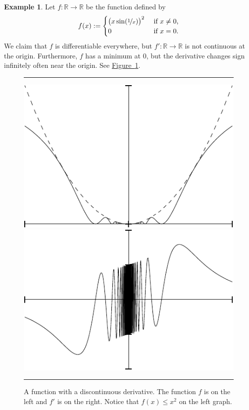 \documentclass[12pt]{book}
\newenvironment{myfigureht}{%
\begin{figure}[h!t]
\noindent\rule{\textwidth}{0.4pt}\vspace{12pt}\par\centering}%
{\par\noindent\rule{\textwidth}{0.4pt}
\end{figure}}
\newcommand{\R}{{\mathbb{R}}}
\theoremstyle{plain}
\theoremstyle{remark}
\theoremstyle{definition}
\theoremstyle{exercise}
\theoremstyle{example}
\newtheorem{example}[thm]{Example}
\newcommand{\figureref}[1]{\hyperref[#1]{Figure~\ref*{#1}}}
\begin{document}
\begin{example} \label{baddifffunc:example}
Let $f \colon \R \to \R$ be the function defined by
\begin{equation*}
f(x) :=
\begin{cases}
{\bigl( x \sin(\nicefrac{1}{x}) \bigr)}^2 & \text{ if $x \not= 0$,} \\
0 & \text{ if $x = 0$.}
\end{cases}
\end{equation*}
We claim that $f$ is differentiable everywhere, but
$f' \colon \R \to \R$ is not continuous at
the origin.  Furthermore, $f$ has a minimum at 0, but the derivative
changes sign infinitely often near the origin.
See \figureref{fig:nonc1diff}.
\begin{myfigureht}
\includegraphics{figures/nonc1difffig}
\qquad
\includegraphics{figures/nonc1diffderfig}
\caption{A function with a discontinuous derivative. The function $f$ is on the left
and $f'$ is on the right.  Notice that $f(x) \leq x^2$ on the left graph.\label{fig:nonc1diff}}
\end{myfigureht}


\end{example}
\end{document}
